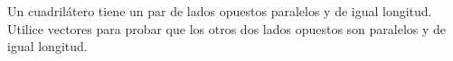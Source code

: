 \item Un cuadrilátero tiene un par de lados opuestos paralelos y de igual longitud. Utilice vectores para probar que los otros dos lados opuestos son paralelos y de igual longitud.
